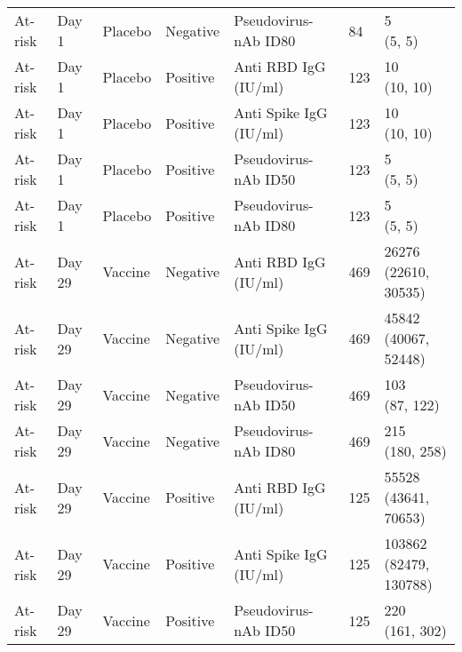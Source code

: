 \documentclass[]{book}
\theoremstyle{definition}
\theoremstyle{definition}
\theoremstyle{definition}
\newcommand{\1}{\mathbbm{1}}
\begin{document}
\begin{landscape}
\begin{ThreePartTable}
\begin{longtable}[t]{>{\raggedright\arraybackslash}p{7cm}llllll}
\hspace{1em}At-risk & Day 1 & Placebo & Negative & Pseudovirus-nAb ID80 & 84 & \makecell[l]{5\\(5, 5)}\\
\hspace{1em}At-risk & Day 1 & Placebo & Positive & Anti RBD IgG (IU/ml) & 123 & \makecell[l]{10\\(10, 10)}\\
\hspace{1em}At-risk & Day 1 & Placebo & Positive & Anti Spike IgG (IU/ml) & 123 & \makecell[l]{10\\(10, 10)}\\
\hspace{1em}At-risk & Day 1 & Placebo & Positive & Pseudovirus-nAb ID50 & 123 & \makecell[l]{5\\(5, 5)}\\
\hspace{1em}At-risk & Day 1 & Placebo & Positive & Pseudovirus-nAb ID80 & 123 & \makecell[l]{5\\(5, 5)}\\
\hspace{1em}At-risk & Day 29 & Vaccine & Negative & Anti RBD IgG (IU/ml) & 469 & \makecell[l]{26276\\(22610, 30535)}\\
\hspace{1em}At-risk & Day 29 & Vaccine & Negative & Anti Spike IgG (IU/ml) & 469 & \makecell[l]{45842\\(40067, 52448)}\\
\hspace{1em}At-risk & Day 29 & Vaccine & Negative & Pseudovirus-nAb ID50 & 469 & \makecell[l]{103\\(87, 122)}\\
\hspace{1em}At-risk & Day 29 & Vaccine & Negative & Pseudovirus-nAb ID80 & 469 & \makecell[l]{215\\(180, 258)}\\
\hspace{1em}At-risk & Day 29 & Vaccine & Positive & Anti RBD IgG (IU/ml) & 125 & \makecell[l]{55528\\(43641, 70653)}\\
\hspace{1em}At-risk & Day 29 & Vaccine & Positive & Anti Spike IgG (IU/ml) & 125 & \makecell[l]{103862\\(82479, 130788)}\\
\hspace{1em}At-risk & Day 29 & Vaccine & Positive & Pseudovirus-nAb ID50 & 125 & \makecell[l]{220\\(161, 302)}\\

\end{longtable}
\end{ThreePartTable}
\end{landscape}
\end{document}
